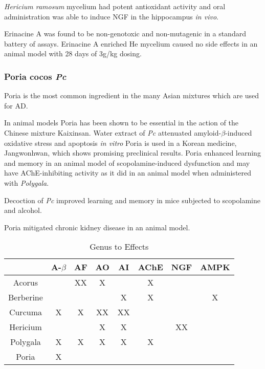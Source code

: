 \textit{Hericium ramosum} mycelium had potent antioxidant activity
and oral administration was able to
induce NGF in the hippocampus \textit{in vivo}.
\cite{suruga2015effects}

Erinacine A was found to be non-genotoxic and
non-mutagenic in a standard battery of assays.
\cite{li2014genotoxicity}
Erinacine A enriched He mycelium caused no side effects
in an animal model with 28 days of 3g/kg dosing.
\cite{li2014evaluation}








\subsubsection{Poria cocos \textit{Pc}}

Poria is the most common ingredient in the
many Asian mixtures which are used for AD.

In animal models Poria has been shown to be essential
in the action of the Chinese mixture Kaixinsan.
\cite{gao2010comparision}
Water extract of \textit{Pc} attenuated
amyloid-$\beta$-induced oxidative stress and apoptosis
\textit{in vitro}
\cite{park2009poria}
Poria is used in a Korean medicine, Jangwonhwan,
which shows promising preclinical results.
\cite{seo2010modified,
seo2010oriental}
Poria enhanced learning and memory in an animal
model of scopolamine-induced dysfunction
\cite{zhang2012effects}
and may have AChE-inhibiting activity
as it did in an animal model when administered with
\textit{Polygala}.
\cite{li2011experimental}

Decoction of \textit{Pc} improved learning and memory
in mice subjected to scopolamine and alcohol.
\cite{zhang2012effects}

Poria mitigated chronic kidney disease in an animal model.
\cite{zhao2013urinary}







\begin{table*}[htp]
\centering

\begin{tabular}{||c c c c c c c c||}
 \hline
                & A-$\beta$ & AF & AO & AI & AChE & NGF & AMPK \\
 \hline\hline
 Acorus         &           & XX &  X &    &   X  &     &      \\
 Berberine      &           &    &    & X  &   X  &     &  X   \\
 Curcuma        &     X     & X  & XX & XX &      &     &      \\
 Hericium       &           &    &  X &  X &      &  XX &      \\
 Polygala       &     X     & X  &  X &  X &   X  &     &      \\
 Poria          &     X     &    &    &    &      &     &      \\
 \hline
\end{tabular}
\caption{Genus to Effects}
\label{table:effects}
\end{table*}




